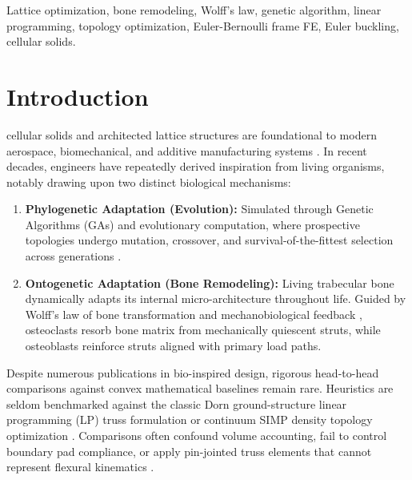 \documentclass[10pt,journal,compsoc]{IEEEtran}
\begin{document}
{\begin{IEEEkeywords}
Lattice optimization, bone remodeling, Wolff's law, genetic algorithm, linear programming, topology optimization, Euler-Bernoulli frame FE, Euler buckling, cellular solids.
\end{IEEEkeywords}}

\maketitle
\IEEEdisplaynontitleabstractindextext
\IEEEpeerreviewmaketitle

\section{Introduction}
 cellular solids and architected lattice structures are foundational to modern aerospace, biomechanical, and additive manufacturing systems \cite{gibson1997cellular, schaedler2016architected}. In recent decades, engineers have repeatedly derived inspiration from living organisms, notably drawing upon two distinct biological mechanisms:
\begin{enumerate}
    \item \textbf{Phylogenetic Adaptation (Evolution):} Simulated through Genetic Algorithms (GAs) and evolutionary computation, where prospective topologies undergo mutation, crossover, and survival-of-the-fittest selection across generations \cite{holland1992adaptation, goldberg1989genetic}.
    \item \textbf{Ontogenetic Adaptation (Bone Remodeling):} Living trabecular bone dynamically adapts its internal micro-architecture throughout life. Guided by Wolff's law of bone transformation \cite{wolff1892gesetz} and mechanobiological feedback \cite{cowin1986wolff, huiskes2000effects, alsheghri2021developmental}, osteoclasts resorb bone matrix from mechanically quiescent struts, while osteoblasts reinforce struts aligned with primary load paths.
\end{enumerate}

Despite numerous publications in bio-inspired design, rigorous head-to-head comparisons against convex mathematical baselines remain rare. Heuristics are seldom benchmarked against the classic Dorn ground-structure linear programming (LP) truss formulation \cite{dorn1964automatic, gilbert2003layout, rozvany2001aims} or continuum SIMP density topology optimization \cite{bendsoe2003topology}. Comparisons often confound volume accounting, fail to control boundary pad compliance, or apply pin-jointed truss elements that cannot represent flexural kinematics \cite{deshpande2001foam}. 
\end{document}
